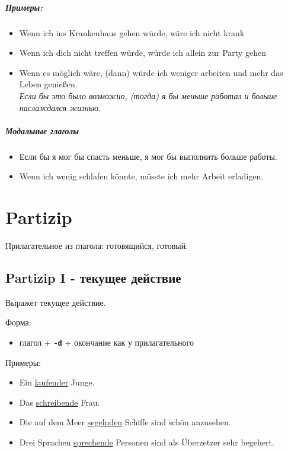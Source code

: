 \documentclass[12pt,a4paper]{report}
\newcommand{\term}[1]{\texttt{\textbf{#1}}}
\newcommand{\satzew}[1]{\underline{#1}}
\newcommand{\ubersatze}[1]{\textit{#1}}
\begin{document}
\paragraph{Примеры:}
\begin{itemize}
    \item Wenn ich ins Krankenhaus gehen würde,  wäre ich nicht krank
    \item Wenn ich dich nicht treffen würde, würde ich allein zur Party gehen
    \item Wenn es möglich wäre, (dann) würde ich weniger arbeiten und mehr das Leben genießen.
          ~\\ \ubersatze{Если бы это было возможно, (тогда) я бы меньше работал и больше наслаждался жизнью.}
\end{itemize}

\paragraph{Модальные глаголы}
\begin{itemize}
    \item Если бы я мог бы спасть меньше, я мог бы выполнить больше работы.
    \item Wenn ich wenig schlafen könnte, müsste ich mehr Arbeit erladigen.
\end{itemize}

\chapter{Partizip}
Прилагательное из глагола: готовящийся, готовый.

\section{Partizip I - текущее действие}

Выражет текущее действие.

Форма:
\begin{itemize}
\item глагол + \term{-d} + окончание как у прилагательного
\end{itemize}

Примеры:
\begin{itemize}
\item Ein \satzew{laufender} Junge.
\item Das \satzew{schreibende} Frau.
\item Die auf dem Meer \satzew{segelnden} Schiffe sind schön anzusehen.
\item Drei Sprachen \satzew{sprechende} Personen sind als Überzetzer sehr begehert.
\end{itemize}
\end{document}
